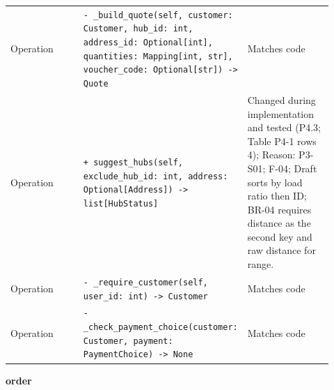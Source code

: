 \begin{longtable}{>{\raggedright\arraybackslash}p{0.3067\linewidth}>{\raggedright\arraybackslash}p{0.3067\linewidth}>{\raggedright\arraybackslash}p{0.3067\linewidth}}
Operation & \texttt{- \_\allowbreak{}build\_\allowbreak{}quote(self, customer: Customer, hub\_\allowbreak{}id: int, address\_\allowbreak{}id: Optional[int], quantities: Mapping[int, str], voucher\_\allowbreak{}code: Optional[str]) -\textgreater{} Quote} & Matches code \\
Operation & \texttt{+ suggest\_\allowbreak{}hubs(self, exclude\_\allowbreak{}hub\_\allowbreak{}id: int, address: Optional[Address]) -\textgreater{} list[HubStatus]} & Changed during implementation and tested (P4.3; Table P4-1 rows 4); Reason: P3-S01; F-04; Draft sorts by load ratio then ID; BR-04 requires distance as the second key and raw distance for range. \\
Operation & \texttt{- \_\allowbreak{}require\_\allowbreak{}customer(self, user\_\allowbreak{}id: int) -\textgreater{} Customer} & Matches code \\
Operation & \texttt{- \_\allowbreak{}check\_\allowbreak{}payment\_\allowbreak{}choice(customer: Customer, payment: PaymentChoice) -\textgreater{} None} & Matches code \\
\end{longtable}
\textbf{order}

